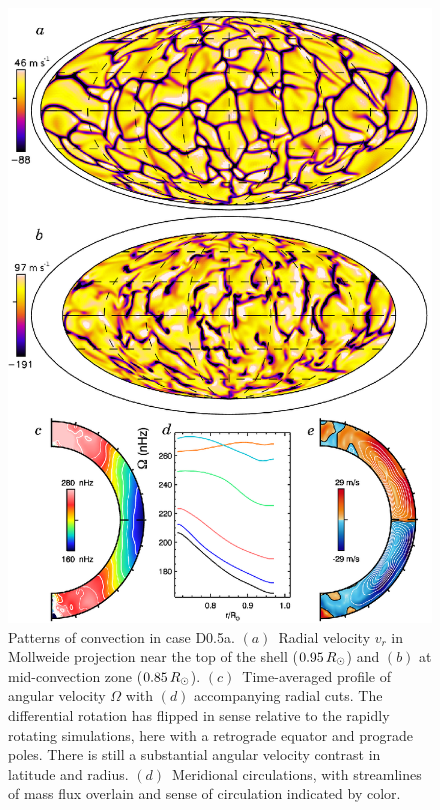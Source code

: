 \begin{figure}
  \begin{center}
    \includegraphics{figs/chapter_8/case_D0.5a_patterns.eps}
  \end{center}
  \caption[Patterns of convection in case D0.5a]
	  {Patterns of convection in case D0.5a.  
  $(a)$~Radial velocity $v_r$ in Mollweide projection
  near the top of the shell ($0.95\thinspace R_\odot$) and  
  $(b)$ at mid-convection zone ($0.85\thinspace R_\odot$).
  $(c)$~Time-averaged profile of angular velocity $\Omega$ with $(d)$
  accompanying radial cuts.  The differential rotation has flipped in
  sense relative to the rapidly rotating simulations, here with a
  retrograde equator and prograde poles.  There is still a substantial
  angular velocity contrast in latitude and radius.
  $(d)$~Meridional circulations, with streamlines of mass flux
  overlain and sense of circulation indicated by color.
  \label{fig:D0.5a}}  
\end{figure}


